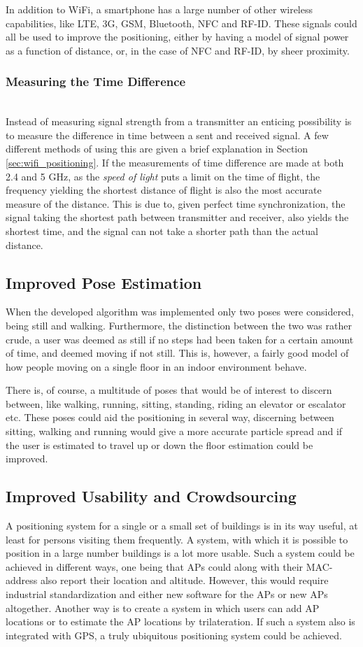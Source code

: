 \documentclass{LTHthesis}
\begin{document}
In addition to WiFi, a smartphone has a large number of other wireless capabilities, like LTE, 3G, GSM, Bluetooth, NFC and RF-ID. These signals could all be used to improve the positioning, either by having a model of signal power as a function of distance, or, in the case of NFC and RF-ID, by sheer proximity.         

\subsubsection{Measuring the Time Difference}~\\
Instead of measuring signal strength from a transmitter an enticing possibility is to measure the difference in time between a sent and received signal. A few different methods of using this are given a brief explanation in Section \ref{sec:wifi_positioning}. If the measurements of time difference are made at both 2.4 and 5 GHz, as the \emph{speed of light} puts a limit on the time of flight, the frequency yielding the shortest distance of flight is also the most accurate measure of the distance. This is due to, given perfect time synchronization, the signal taking the shortest path between transmitter and receiver, also yields the shortest time, and the signal can not take a shorter path than the actual distance.    
%
\subsection{Improved Pose Estimation}
%
When the developed algorithm was implemented only two poses were considered, being still and walking. Furthermore, the distinction  between the two was rather crude, a user was deemed as still if no steps had been taken for a certain amount of time, and deemed moving if not still. This is, however, a fairly good model of how people moving on a single floor in an indoor environment behave. 

There is, of course, a multitude of poses that would be of interest to discern between, like walking, running, sitting, standing, riding an elevator or escalator etc. These poses could aid the positioning in several way, discerning between sitting, walking and running would give a more accurate particle spread and if the user is estimated to travel up or down the floor estimation could be improved.
%
\subsection{Improved Usability and Crowdsourcing}
%
A positioning system for a single or a small set of buildings is in its way useful, at least for persons visiting them frequently. A system, with which it is possible to position in a large number buildings is a lot more usable. Such a system could be achieved in different ways, one being that APs could along with their MAC-address also report their location and altitude. However, this would require industrial standardization and either new software for the APs or new APs altogether. Another way is to create a system in which users can add AP locations or to estimate the AP locations by trilateration. If such a system also is integrated with GPS, a truly ubiquitous positioning system could be achieved.
\end{document}

